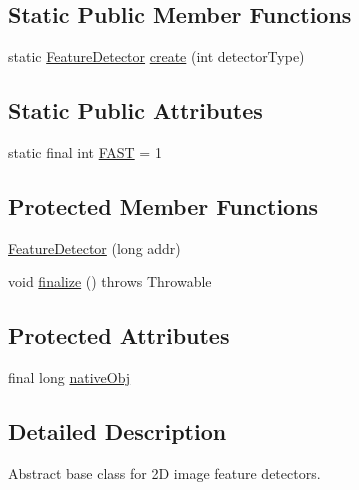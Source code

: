 \subsection*{Static Public Member Functions}
\begin{DoxyCompactItemize}
\item 
static \mbox{\hyperlink{classorg_1_1opencv_1_1features2d_1_1_feature_detector}{Feature\+Detector}} \mbox{\hyperlink{classorg_1_1opencv_1_1features2d_1_1_feature_detector_a012b14ed443bac6369ac490c46f0bbe6}{create}} (int detector\+Type)
\end{DoxyCompactItemize}
\subsection*{Static Public Attributes}
\begin{DoxyCompactItemize}
\item 
static final int \mbox{\hyperlink{classorg_1_1opencv_1_1features2d_1_1_feature_detector_ac186edb6ab9f9488b538a0e90a93a25e}{F\+A\+ST}} = 1
\end{DoxyCompactItemize}
\subsection*{Protected Member Functions}
\begin{DoxyCompactItemize}
\item 
\mbox{\hyperlink{classorg_1_1opencv_1_1features2d_1_1_feature_detector_a70444b12fbe0bf54bcdc5f2776d6c0e7}{Feature\+Detector}} (long addr)
\item 
void \mbox{\hyperlink{classorg_1_1opencv_1_1features2d_1_1_feature_detector_a5a738fcae17faaff22d9ce400190d166}{finalize}} ()  throws Throwable 
\end{DoxyCompactItemize}
\subsection*{Protected Attributes}
\begin{DoxyCompactItemize}
\item 
final long \mbox{\hyperlink{classorg_1_1opencv_1_1features2d_1_1_feature_detector_a6ab4158ea606cd45ed8a4b6d2d2e7be1}{native\+Obj}}
\end{DoxyCompactItemize}


\subsection{Detailed Description}
Abstract base class for 2D image feature detectors.

